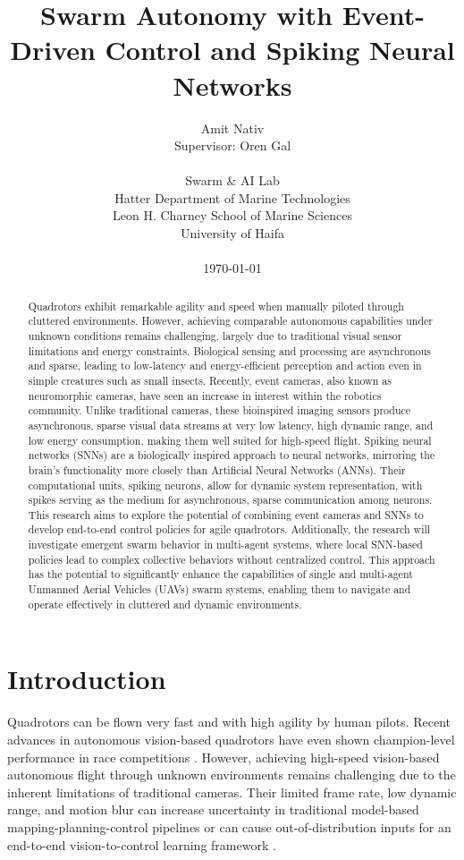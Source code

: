 \documentclass{article}
\title{Swarm Autonomy with Event-Driven Control and Spiking Neural Networks}
\author{
    Amit Nativ \\ 
    Supervisor: Oren Gal \\
    \\
    Swarm \& AI Lab \\
    Hatter Department of Marine Technologies \\
    Leon H. Charney School of Marine Sciences \\
    University of Haifa \\
    \\
    \today
}
\begin{document}
\maketitle

\begin{abstract}
    Quadrotors exhibit remarkable agility and speed when manually piloted through cluttered environments. However, achieving comparable autonomous capabilities under unknown conditions remains challenging, largely due to traditional visual sensor limitations and energy constraints. Biological sensing and processing are asynchronous and sparse, leading to low-latency and energy-efficient perception and action even in simple creatures such as small insects. Recently, event cameras, also known as neuromorphic cameras, have seen an increase in interest within the robotics community. Unlike traditional cameras, these bioinspired imaging sensors produce asynchronous, sparse visual data streams at very low latency, high dynamic range, and low energy consumption, making them well suited for high-speed flight. Spiking neural networks (SNNs) are a biologically inspired approach to neural networks, mirroring the brain's functionality more closely than Artificial Neural Networks (ANNs). Their computational units, spiking neurons, allow for dynamic system representation, with spikes serving as the medium for asynchronous, sparse communication among neurons. This research aims to explore the potential of combining event cameras and SNNs to develop end-to-end control policies for agile quadrotors. Additionally, the research will investigate emergent swarm behavior in multi-agent systems, where local SNN-based policies lead to complex collective behaviors without centralized control. This approach has the potential to significantly enhance the capabilities of single and multi-agent Unmanned Aerial Vehicles (UAVs) swarm systems, enabling them to navigate and operate effectively in cluttered and dynamic environments.
\end{abstract}

\section{Introduction}
Quadrotors can be flown very fast and with high agility by human pilots. Recent advances in autonomous vision-based quadrotors have even shown champion-level performance in race competitions \cite{kaufmannChampionlevelDroneRacing2023, romeroDreamFlyModelBased2025a, loquercioLearningHighSpeedFlight2021}. However, achieving high-speed vision-based autonomous flight through unknown environments remains challenging due to the inherent limitations of traditional cameras. Their limited frame rate, low dynamic range, and motion blur can increase uncertainty in traditional model-based mapping-planning-control pipelines or can cause out-of-distribution inputs for an end-to-end vision-to-control learning framework \cite{bhattacharyaVisionTransformersEndtoEnd2025}. 
\end{document}
